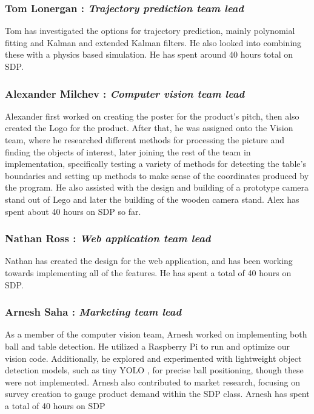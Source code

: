 \documentclass{article}
\begin{document}
\subsubsection{Tom Lonergan : \emph{Trajectory prediction team lead}}
Tom has investigated the options for trajectory prediction, mainly polynomial fitting and Kalman and extended Kalman filters. He also looked into combining these with a physics based simulation. He has spent around 40 hours total on SDP.

\subsubsection{Alexander Milchev : \emph{Computer vision team lead}} Alexander first worked on creating the poster for the product's pitch, then also created the Logo for the product. After that, he was assigned onto the Vision team, where he researched different methods for processing the picture and finding the objects of interest, later joining the rest of the team in implementation, specifically testing a variety of methods for detecting the table's boundaries and setting up methods to make sense of the coordinates produced by the program. He also assisted with the design and building of a prototype camera stand out of Lego and later the building of the wooden camera stand. Alex has spent about 40 hours on SDP so far.

\subsubsection{Nathan Ross : \emph{Web application team lead}} Nathan has created the design for the web application, and has been working towards implementing all of the features. He has spent a total of 40 hours on SDP. 

\subsubsection{Arnesh Saha : \emph{Marketing team lead}} As a member of the computer vision team, Arnesh worked on implementing both ball and table detection. He utilized a Raspberry Pi to run and optimize our vision code. Additionally, he explored and experimented with lightweight object detection models, such as tiny YOLO \cite{YOLO}, for precise ball positioning, though these were not implemented. Arnesh also contributed to market research, focusing on survey creation to gauge product demand within the SDP class. Arnesh has spent a total of 40 hours on SDP
\end{document}
